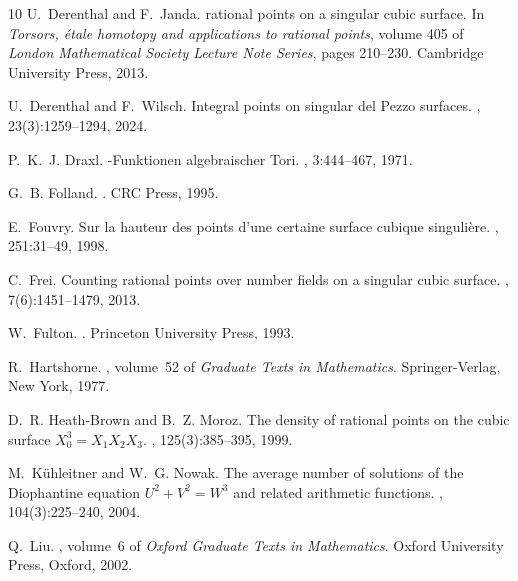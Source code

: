 \begin{thebibliography}{10}
U.~Derenthal and F.~Janda.
 rational points on a singular cubic surface.
\newblock In {\em Torsors, \'etale homotopy and applications to rational
  points}, volume 405 of {\em London Mathematical Society Lecture Note Series},
  pages 210--230. Cambridge University Press, 2013.

U.~Derenthal and F.~Wilsch.
\newblock Integral points on singular del {Pezzo} surfaces.
,
  23(3):1259--1294, 2024.

P.~K.~J. Draxl.
-{F}unktionen algebraischer {T}ori.
, 3:444--467, 1971.

G.~B. Folland.
.
\newblock CRC Press, 1995.

E.~Fouvry.
\newblock Sur la hauteur des points d'une certaine surface cubique
  singuli\`ere.
, 251:31--49, 1998.

C.~Frei.
\newblock Counting rational points over number fields on a singular cubic
  surface.
, 7(6):1451--1479, 2013.

W.~Fulton.
.
\newblock Princeton University Press, 1993.

R.~Hartshorne.
, volume~52 of {\em Graduate Texts in
  Mathematics}.
\newblock Springer-Verlag, New York, 1977.

D.~R. Heath-Brown and B.~Z. Moroz.
\newblock The density of rational points on the cubic surface
  {$X_0^3=X_1X_2X_3$}.
, 125(3):385--395, 1999.

M.~K{\"u}hleitner and W.~G. Nowak.
\newblock The average number of solutions of the {Diophantine} equation
  {$U^2+V^2=W^3$} and related arithmetic functions.
, 104(3):225--240, 2004.

Q.~Liu.
, volume~6 of {\em
  Oxford Graduate Texts in Mathematics}.
\newblock Oxford University Press, Oxford, 2002.


\end{thebibliography}
